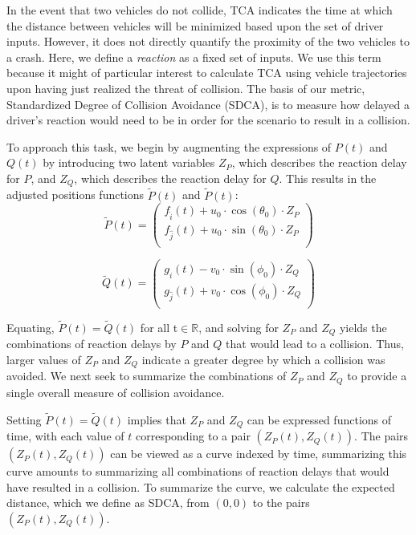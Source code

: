 \documentclass{article}
\begin{document}
In the event that two vehicles do not collide, TCA indicates the time at which the distance between vehicles will be minimized based upon the set of driver inputs. However, it does not directly quantify the proximity of the two vehicles to a crash. Here, we define a \textit{reaction} as a fixed set of inputs.  We use this term because it might of particular interest to calculate TCA using vehicle trajectories upon having just realized the threat of collision.  The basis of our metric, Standardized Degree of Collision Avoidance (SDCA), is to measure how delayed a driver's reaction would need to be in order for the scenario to result in a collision. 

To approach this task, we begin by augmenting the expressions of $P(t)$ and $Q(t)$ by introducing two latent variables $Z_P$, which describes the reaction delay for $P$, and $Z_Q$, which describes the reaction delay for $Q$. This results in the adjusted positions functions $\tilde{P}(t)$ and $\tilde{P}(t)$:
\begin{equation*}
    \tilde{P}(t) =
  \left( {\begin{array}{c}
   f_{\hat{i}}(t) + u_0\cdot\cos(\theta_0)\cdot Z_P\\
   f_{\hat{j}}(t) + u_0\cdot\sin(\theta_0)\cdot Z_P \\
  \end{array} } \right)
  \label{pdot}
\end{equation*}

\begin{equation*}
   \tilde{Q}(t) =
  \left( {\begin{array}{c}
   g_{\hat{i}}(t) - v_0\cdot\sin(\phi_0)\cdot Z_Q\\
   g_{\hat{j}}(t) + v_0\cdot\cos(\phi_0)\cdot Z_Q\\
  \end{array} } \right)
  \label{qdot}
\end{equation*}

Equating, $\tilde{P}(t) = \tilde{Q}(t)$ for all t$\in\mathbb{R}$, and solving for $Z_P$ and $Z_Q$ yields the combinations of reaction delays by $P$ and $Q$ that would lead to a collision.  Thus, larger values of $Z_P$ and $Z_Q$ indicate a greater degree by which a collision was avoided.  We next seek to summarize the combinations of $Z_P$ and $Z_Q$ to provide a single overall measure of collision avoidance.

Setting $\tilde{P}(t) = \tilde{Q}(t)$ implies that $Z_P$ and $Z_Q$ can be expressed functions of time, with each value of $t$ corresponding to a pair $(Z_P(t), Z_Q(t) )$.  The pairs $(Z_P(t), Z_Q(t))$ can be viewed as a curve indexed by time, summarizing this curve amounts to summarizing all combinations of reaction delays that would have resulted in a collision. To summarize the curve, we calculate the expected distance, which we define as SDCA, from $(0,0)$ to the pairs $(Z_P(t), Z_Q(t))$. 
\end{document}
